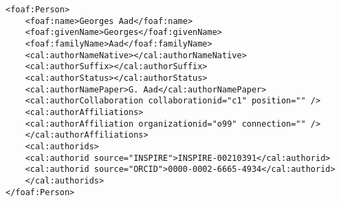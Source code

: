 \begin{lstlisting}
<foaf:Person>
    <foaf:name>Georges Aad</foaf:name>
    <foaf:givenName>Georges</foaf:givenName>
    <foaf:familyName>Aad</foaf:familyName>
    <cal:authorNameNative></cal:authorNameNative>
    <cal:authorSuffix></cal:authorSuffix>
    <cal:authorStatus></cal:authorStatus>
    <cal:authorNamePaper>G. Aad</cal:authorNamePaper>
    <cal:authorCollaboration collaborationid="c1" position="" />
    <cal:authorAffiliations>
    <cal:authorAffiliation organizationid="o99" connection="" />
    </cal:authorAffiliations>
    <cal:authorids>
    <cal:authorid source="INSPIRE">INSPIRE-00210391</cal:authorid>
    <cal:authorid source="ORCID">0000-0002-6665-4934</cal:authorid>
    </cal:authorids>
</foaf:Person>
\end{lstlisting}